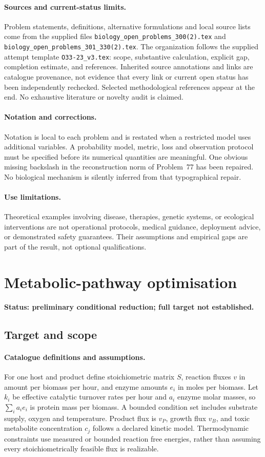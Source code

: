 \documentclass[11pt]{article}
\begin{document}
\paragraph{Sources and current-status limits.}
Problem statements, definitions, alternative formulations and local source lists
come from the supplied files
\texttt{biology\_open\_problems\_300(2).tex} and
\texttt{biology\_open\_problems\_301\_330(2).tex}.
The organization follows the supplied attempt template
\texttt{O33-23\_v3.tex}: scope, substantive calculation, explicit gap,
completion estimate, and references. Inherited source annotations and links are
catalogue provenance, not evidence that every link or current open status has
been independently rechecked. Selected methodological references appear at the
end. No exhaustive literature or novelty audit is claimed.

\paragraph{Notation and corrections.}
Notation is local to each problem and is restated when a restricted model uses
additional variables. A probability model, metric, loss and observation protocol
must be specified before its numerical quantities are meaningful. One obvious
missing backslash in the reconstruction norm of Problem~77 has been repaired.
No biological mechanism is silently inferred from that typographical repair.

\paragraph{Use limitations.}
Theoretical examples involving disease, therapies, genetic systems, or ecological
interventions are not operational protocols, medical guidance, deployment advice,
or demonstrated safety guarantees. Their assumptions and empirical gaps are part
of the result, not optional qualifications.


\section*{Metabolic-pathway optimisation}
\label{prob:276}
\noindent\textbf{Status: preliminary conditional reduction; full target not established.}
\subsection{Target and scope}
\paragraph{Catalogue definitions and assumptions.}
For one host and product define stoichiometric matrix $S$, reaction fluxes $v$ in amount per biomass per hour, and enzyme amounts $e_i$ in moles per biomass. Let $k_i$ be effective catalytic turnover rates per hour and $a_i$ enzyme molar masses, so $\sum_i a_i e_i$ is protein mass per biomass. A bounded condition set includes substrate supply, oxygen and temperature. Product flux is $v_P$, growth flux $v_B$, and toxic metabolite concentration $c_j$ follows a declared kinetic model. Thermodynamic constraints use measured or bounded reaction free energies, rather than assuming every stoichiometrically feasible flux is realizable.
\end{document}
